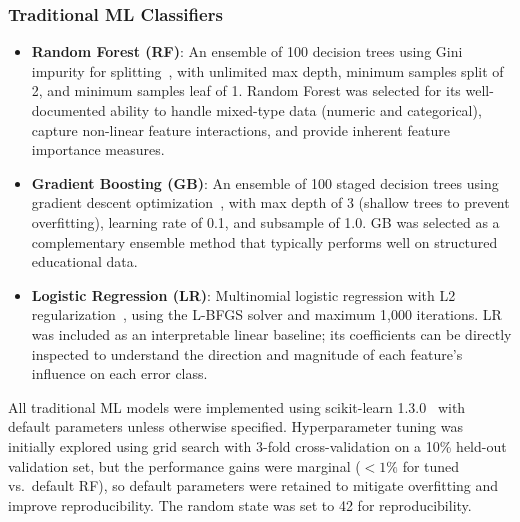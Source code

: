 \documentclass[acmsmall]{acmart}
\begin{document}
\subsubsection*{Traditional ML Classifiers}
\begin{itemize}
    \item \textbf{Random Forest (RF)}: An ensemble of 100 decision trees using
          Gini impurity for splitting~\cite{breiman2001random}, with unlimited
          max depth, minimum samples split of 2, and minimum samples leaf of 1.
          Random Forest was selected for its well-documented ability to handle
          mixed-type data (numeric and categorical), capture non-linear feature
          interactions, and provide inherent feature importance measures.
    \item \textbf{Gradient Boosting (GB)}: An ensemble of 100 staged
          decision trees using gradient descent
          optimization~\cite{friedman2001greedy}, with max depth
          of 3 (shallow trees to prevent overfitting), learning rate of 0.1,
          and subsample of 1.0. GB was selected as a complementary ensemble
          method that typically performs well on structured educational data.
    \item \textbf{Logistic Regression (LR)}: Multinomial logistic regression
          with L2 regularization~\cite{hosmer2013logistic}, using the L-BFGS
          solver and maximum 1,000 iterations. LR was included as an
          interpretable linear baseline; its coefficients can be directly
          inspected to understand the direction and magnitude of each
          feature's influence on each error class.
\end{itemize}

All traditional ML models were implemented using scikit-learn
1.3.0~\cite{pedregosa2011scikit} with default parameters unless otherwise
specified. Hyperparameter tuning was initially explored using grid search
with 3-fold cross-validation on a 10\% held-out validation set, but the
performance gains were marginal ($< 1\%$ for tuned vs.\ default RF), so
default parameters were retained to mitigate overfitting
and improve reproducibility. The random state was set to 42 for
reproducibility.
\end{document}
